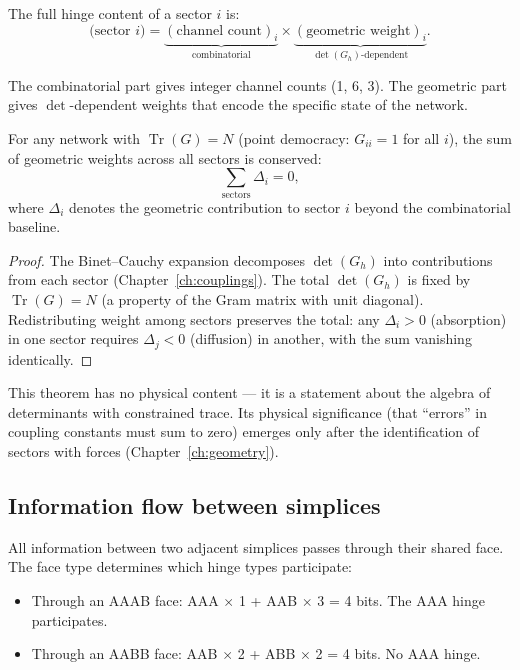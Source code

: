 The full hinge content of a sector $i$ is:
\begin{equation}
\text{(sector $i$)} = \underbrace{(\text{channel count})_i}_{\text{combinatorial}} \times \underbrace{(\text{geometric weight})_i}_{\det(G_h)\text{-dependent}}.
\end{equation}

The combinatorial part gives integer channel counts (1, 6, 3). The geometric part gives $\det$-dependent weights that encode the specific state of the network.

\begin{theorem}
\label{thm:trace_conservation}
For any network with $\operatorname{Tr}(G) = N$ (point democracy: $G_{ii} = 1$ for all $i$), the sum of geometric weights across all sectors is conserved:
\begin{equation}
\sum_{\text{sectors}} \Delta_i = 0,
\end{equation}
where $\Delta_i$ denotes the geometric contribution to sector $i$ beyond the combinatorial baseline.
\end{theorem}

\begin{proof}
The Binet--Cauchy expansion decomposes $\det(G_h)$ into contributions from each sector (Chapter~\ref{ch:couplings}). The total $\det(G_h)$ is fixed by $\operatorname{Tr}(G) = N$ (a property of the Gram matrix with unit diagonal). Redistributing weight among sectors preserves the total: any $\Delta_i > 0$ (absorption) in one sector requires $\Delta_j < 0$ (diffusion) in another, with the sum vanishing identically.
\end{proof}

\begin{remark}
This theorem has no physical content --- it is a statement about the algebra of determinants with constrained trace. Its physical significance (that ``errors'' in coupling constants must sum to zero) emerges only after the identification of sectors with forces (Chapter~\ref{ch:geometry}).
\end{remark}

\subsection{Information flow between simplices}

All information between two adjacent simplices passes through their shared face. The face type determines which hinge types participate:

\begin{itemize}
\item Through an AAAB face: AAA $\times$ 1 + AAB $\times$ 3 = 4 bits. The AAA hinge participates.
\item Through an AABB face: AAB $\times$ 2 + ABB $\times$ 2 = 4 bits. No AAA hinge.
\end{itemize}

